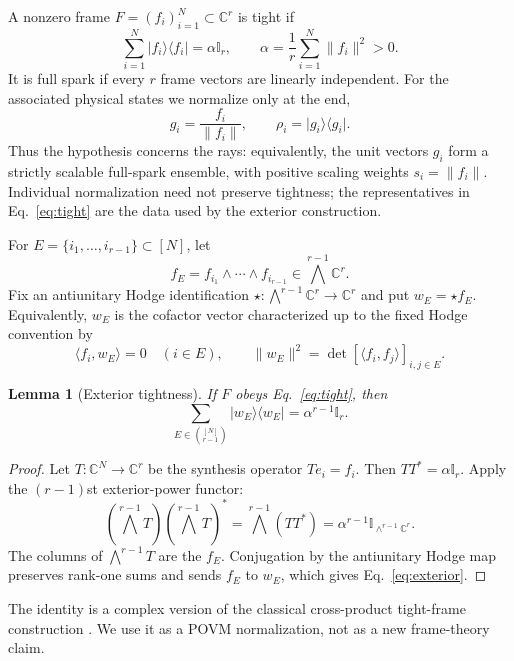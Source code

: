 \documentclass[11pt,a4paper]{article}
\newtheorem{lemma}[theorem]{Lemma}
\newcommand{\C}{\mathbb{C}}
\newcommand{\I}{\mathbb{I}}
\newcommand{\ket}[1]{\lvert #1\rangle}
\newcommand{\bra}[1]{\langle #1\rvert}
\newcommand{\proj}[1]{\ket{#1}\!\bra{#1}}
\begin{document}
A nonzero frame $F=(f_i)_{i=1}^N\subset\C^r$ is tight if
\begin{equation}\label{eq:tight}
  \sum_{i=1}^N\proj{f_i}=\alpha\I_r,
  \qquad \alpha=\frac1r\sum_{i=1}^N\|f_i\|^2>0.
\end{equation}
It is full spark if every $r$ frame vectors are linearly independent.
For the associated physical states we normalize only at the end,
\begin{equation}\label{eq:rays}
  g_i=\frac{f_i}{\|f_i\|},\qquad \rho_i=\proj{g_i}.
\end{equation}
Thus the hypothesis concerns the rays: equivalently, the unit vectors $g_i$
form a strictly scalable full-spark ensemble, with positive scaling weights
$s_i=\|f_i\|$.  Individual normalization need not preserve tightness; the
representatives in Eq.~\eqref{eq:tight} are the data used by the exterior
construction.

For $E=\{i_1,\ldots,i_{r-1}\}\subset[N]$, let
\[
  f_E=f_{i_1}\wedge\cdots\wedge f_{i_{r-1}}
  \in\bigwedge^{r-1}\C^r.
\]
Fix an antiunitary Hodge identification
$\star:\bigwedge^{r-1}\C^r\to\C^r$ and put $w_E=\star f_E$.  Equivalently,
$w_E$ is the cofactor vector characterized up to the fixed Hodge convention by
\begin{equation}\label{eq:orth}
  \langle f_i,w_E\rangle=0\quad(i\in E),
  \qquad \|w_E\|^2=\det[\langle f_i,f_j\rangle]_{i,j\in E}.
\end{equation}

\begin{lemma}[Exterior tightness]\label{lem:exterior}
If $F$ obeys Eq.~\eqref{eq:tight}, then
\begin{equation}\label{eq:exterior}
  \sum_{E\in\binom{[N]}{r-1}}\proj{w_E}
  =\alpha^{r-1}\I_r.
\end{equation}
\end{lemma}

\begin{proof}
Let $T:\C^N\to\C^r$ be the synthesis operator $Te_i=f_i$.  Then
$TT^*=\alpha\I_r$.  Apply the $(r-1)$st exterior-power functor:
\[
 (\bigwedge^{r-1}T)(\bigwedge^{r-1}T)^*
 =\bigwedge^{r-1}(TT^*)
 =\alpha^{r-1}\I_{\wedge^{r-1}\C^r}.
\]
The columns of $\bigwedge^{r-1}T$ are the $f_E$.  Conjugation by the
antiunitary Hodge map preserves rank-one sums and sends $f_E$ to $w_E$,
which gives Eq.~\eqref{eq:exterior}.
\end{proof}

The identity is a complex version of the classical cross-product tight-frame
construction \cite{Ivanov2021}.  We use it as a POVM normalization, not as a
new frame-theory claim.
\end{document}
